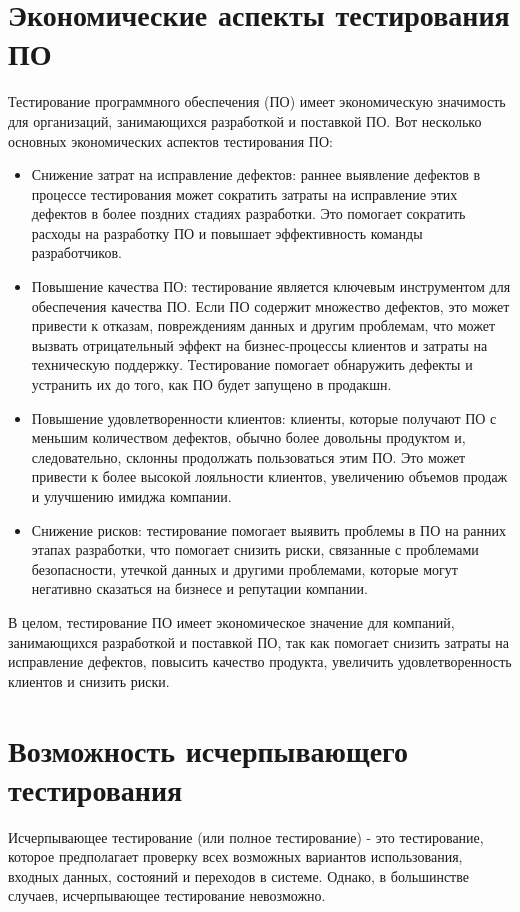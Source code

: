 \section{Экономические аспекты тестирования ПО}
Тестирование программного обеспечения (ПО) имеет экономическую значимость для организаций, занимающихся разработкой и поставкой ПО. Вот несколько основных экономических аспектов тестирования ПО:
\begin{itemize}
    \item Снижение затрат на исправление дефектов: раннее выявление дефектов в процессе тестирования может сократить затраты на исправление этих дефектов в более поздних стадиях разработки. Это помогает сократить расходы на разработку ПО и повышает эффективность команды разработчиков.

    \item Повышение качества ПО: тестирование является ключевым инструментом для обеспечения качества ПО. Если ПО содержит множество дефектов, это может привести к отказам, повреждениям данных и другим проблемам, что может вызвать отрицательный эффект на бизнес-процессы клиентов и затраты на техническую поддержку. Тестирование помогает обнаружить дефекты и устранить их до того, как ПО будет запущено в продакшн.

    \item Повышение удовлетворенности клиентов: клиенты, которые получают ПО с меньшим количеством дефектов, обычно более довольны продуктом и, следовательно, склонны продолжать пользоваться этим ПО. Это может привести к более высокой лояльности клиентов, увеличению объемов продаж и улучшению имиджа компании.

    \item Снижение рисков: тестирование помогает выявить проблемы в ПО на ранних этапах разработки, что помогает снизить риски, связанные с проблемами безопасности, утечкой данных и другими проблемами, которые могут негативно сказаться на бизнесе и репутации компании.
\end{itemize}
В целом, тестирование ПО имеет экономическое значение для компаний, занимающихся разработкой и поставкой ПО, так как помогает снизить затраты на исправление дефектов, повысить качество продукта, увеличить удовлетворенность клиентов и снизить риски.
\section{Возможность исчерпывающего тестирования}
Исчерпывающее тестирование (или полное тестирование) - это тестирование, которое предполагает проверку всех возможных вариантов использования, входных данных, состояний и переходов в системе. Однако, в большинстве случаев, исчерпывающее тестирование невозможно.

